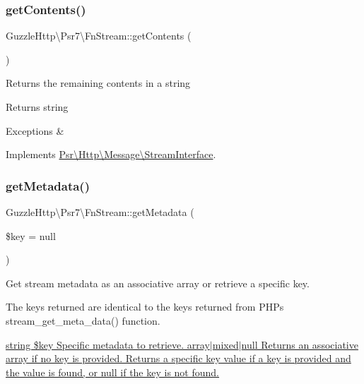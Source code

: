 \subsubsection{\texorpdfstring{get\+Contents()}{getContents()}}
{\footnotesize\ttfamily Guzzle\+Http\textbackslash{}\+Psr7\textbackslash{}\+Fn\+Stream\+::get\+Contents (\begin{DoxyParamCaption}{ }\end{DoxyParamCaption})}

Returns the remaining contents in a string

\begin{DoxyReturn}{Returns}
string 
\end{DoxyReturn}

\begin{DoxyExceptions}{Exceptions}
{\em } & \\
\hline
\end{DoxyExceptions}


Implements \hyperlink{interfacePsr_1_1Http_1_1Message_1_1StreamInterface_a77f73d536f77e4a4e281d548ee905276}{Psr\textbackslash{}\+Http\textbackslash{}\+Message\textbackslash{}\+Stream\+Interface}.

\mbox{\label{classGuzzleHttp_1_1Psr7_1_1FnStream_a9c89106787767a9c5d48ea71c72ace45}} 
\subsubsection{\texorpdfstring{get\+Metadata()}{getMetadata()}}
{\footnotesize\ttfamily Guzzle\+Http\textbackslash{}\+Psr7\textbackslash{}\+Fn\+Stream\+::get\+Metadata (\begin{DoxyParamCaption}\item[{}]{\$key = {\ttfamily null} }\end{DoxyParamCaption})}

Get stream metadata as an associative array or retrieve a specific key.

The keys returned are identical to the keys returned from P\+HP\textquotesingle{}s stream\+\_\+get\+\_\+meta\+\_\+data() function.

\hyperlink{}{string \$key Specific metadata to retrieve.  array$\vert$mixed$\vert$null Returns an associative array if no key is provided. Returns a specific key value if a key is provided and the value is found, or null if the key is not found. }

